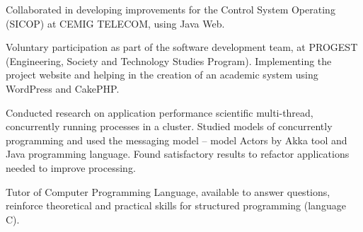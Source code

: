 \documentclass[9pt,a4paper]{altacv}
\begin{document}
\divider


Collaborated in developing improvements for the Control System Operating (SICOP) at CEMIG TELECOM, using Java Web.

\divider


Voluntary participation as part of the software development team, at PROGEST (Engineering, Society and Technology Studies Program). Implementing the project website and helping in the creation of an academic system using WordPress and CakePHP.

\divider


Conducted research on application performance scientific multi-thread, concurrently running processes in a cluster. Studied models of concurrently programming and used the messaging model – model Actors by Akka tool and Java programming language. Found satisfactory results to refactor applications needed to improve processing.

\divider


Tutor of Computer Programming Language, available to answer questions, reinforce theoretical and practical skills for structured programming (language C).




\clearpage

\end{document}
